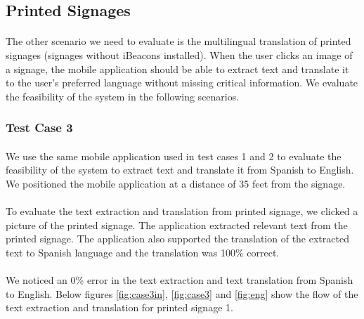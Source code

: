 \documentclass[12pt]{article}
\begin{document}
\subsection{Printed Signages }
\label{twoone}
\paragraph{}The other scenario we need to evaluate is the multilingual translation of printed signages (signages without iBeacons installed). When the user clicks an image of a signage, the mobile application should be able to extract text and translate it to the user's preferred language without missing critical information. We evaluate the feasibility of the system in the following scenarios.

\subsubsection{Test Case 3}
\label{threetwo}
\paragraph{}We use the same mobile application used in test cases 1 and 2 to evaluate the feasibility of the system to extract text and translate it from Spanish to English. We positioned the mobile application at a distance of 35 feet from the signage.

\paragraph{}To evaluate the text extraction and translation from printed signage, we clicked a picture of the printed signage. The application extracted relevant text from the printed signage. The application also supported the translation of the extracted text to Spanish language and the translation was 100\% correct.

\paragraph{}We noticed an 0\% error in the text extraction and text translation from Spanish to English. Below figures \ref{fig:case3in}, \ref{fig:case3} and \ref{fig:eng} show the flow of the text extraction and translation for printed signage 1.
\end{document}
